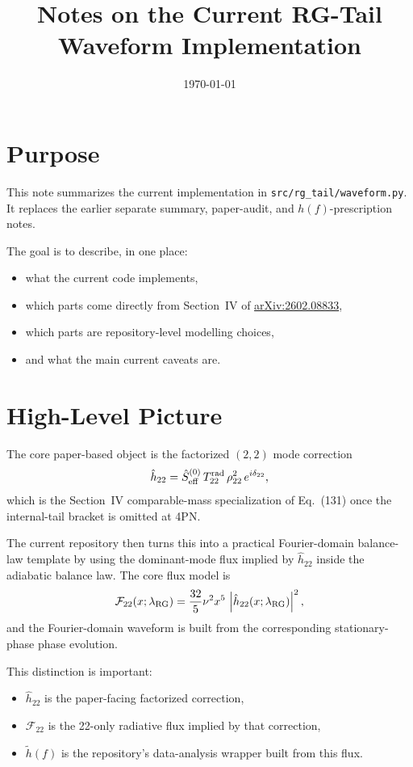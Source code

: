 \documentclass[11pt]{article}
\title{Notes on the Current RG-Tail Waveform Implementation}
\author{}
\date{\today}
\begin{document}
\maketitle

\section{Purpose}

This note summarizes the current implementation in
\texttt{src/rg\_tail/waveform.py}. It replaces the earlier separate summary,
paper-audit, and \(h(f)\)-prescription notes.

The goal is to describe, in one place:
\begin{itemize}
  \item what the current code implements,
  \item which parts come directly from Section~IV of
  \href{https://arxiv.org/abs/2602.08833}{arXiv:2602.08833},
  \item which parts are repository-level modelling choices,
  \item and what the main current caveats are.
\end{itemize}

\section{High-Level Picture}

The core paper-based object is the factorized \((2,2)\) mode correction
\begin{equation}
  \hat h_{22}
  =
  \hat S_{\rm eff}^{(0)}\,
  T_{22}^{\rm rad}\,
  \rho_{22}^2\,
  e^{i\delta_{22}},
\end{equation}
which is the Section~IV comparable-mass specialization of Eq.~(131) once the
internal-tail bracket is omitted at 4PN.

The current repository then turns this into a practical Fourier-domain
balance-law template by using the dominant-mode flux implied by
\(\hat h_{22}\) inside the adiabatic balance law. The core flux model is
\begin{equation}
  \mathcal F_{22}(x;\lambda_{\rm RG})
  =
  \frac{32}{5}\nu^2 x^5\,\left|\hat h_{22}(x;\lambda_{\rm RG})\right|^2,
\end{equation}
and the Fourier-domain waveform is built from the corresponding
stationary-phase phase evolution.

This distinction is important:
\begin{itemize}
  \item \(\hat h_{22}\) is the paper-facing factorized correction,
  \item \(\mathcal F_{22}\) is the 22-only radiative flux implied by that
  correction,
  \item \(\tilde h(f)\) is the repository's data-analysis wrapper built from
  this flux.
\end{itemize}
\end{document}
